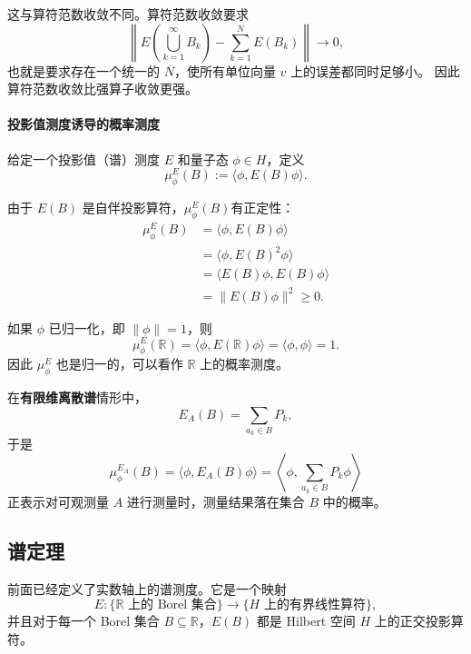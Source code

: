\documentclass[UTF8,a4paper,11pt,openany]{ctexbook}
\begin{document}
这与算符范数收敛不同。算符范数收敛要求
\[
\left\|
E\!\left(\bigcup_{k=1}^{\infty}B_k\right)
-
\sum_{k=1}^{N}E(B_k)
\right\|
\to0,
\]
也就是要求存在一个统一的 $N$，使所有单位向量 $v$ 上的误差都同时足够小。
因此算符范数收敛比强算子收敛更强。

\paragraph{投影值测度诱导的概率测度}

给定一个投影值（谱）测度 $E$ 和量子态 $\phi\in H$，定义
\begin{equation}
    \mu_\phi^E(B)
    :=
    \langle\phi,E(B)\phi\rangle.
\end{equation}

由于 $E(B)$ 是自伴投影算符，$\mu_\phi^E(B)$有正定性：
\begin{align}
    \mu_\phi^E(B)
    &=
    \langle\phi,E(B)\phi\rangle
    \nonumber\\
    &=
    \langle\phi,E(B)^2\phi\rangle
    \nonumber\\
    &=
    \langle E(B)\phi,E(B)\phi\rangle
    \nonumber\\
    &=
    \|E(B)\phi\|^2
    \geq0.
\end{align}

如果 $\phi$ 已归一化，即 $\|\phi\|=1$，则
\begin{equation}
    \mu_\phi^E(\mathbb R)
    =
    \langle\phi,E(\mathbb R)\phi\rangle
    =
    \langle\phi,\phi\rangle
    =
    1.
\end{equation}
因此 $\mu_\phi^E$ 也是归一的，可以看作 $\mathbb R$ 上的概率测度。

在\textbf{有限维离散谱}情形中，
\[
E_A(B)=\sum_{a_k\in B}P_k,
\]
于是
\begin{equation}
    \mu_\phi^{E_A}(B)
    =
    \langle\phi,E_A(B)\phi\rangle
   = \left\langle\phi,\sum_{a_k\in B}P_k\phi \right\rangle
\end{equation}
正表示对可观测量 $A$ 进行测量时，测量结果落在集合 $B$ 中的概率。

\subsection{谱定理}

前面已经定义了实数轴上的谱测度。它是一个映射
\[
E:
\{\mathbb R\text{ 上的 Borel 集合}\}
\longrightarrow
\{H\text{ 上的有界线性算符}\},
\]
并且对于每一个 Borel 集合 $B\subseteq\mathbb R$，$E(B)$ 都是 Hilbert 空间 $H$ 上的正交投影算符。
\end{document}

